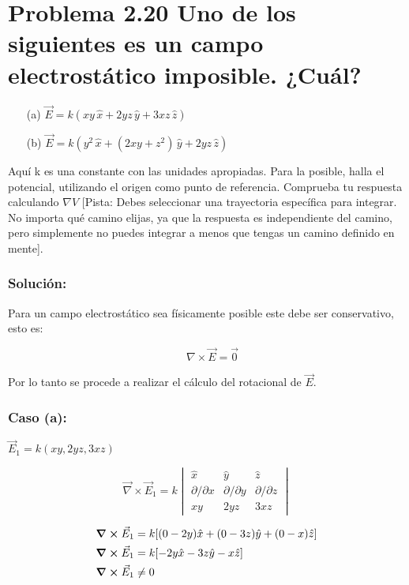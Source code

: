 \documentclass{article}
\newcommand{\problema}[2]{%
  \vspace{0.5cm}
  {\noindent\textbf{Problema #1} #2} 
  \noindent 
}
\begin{document}


\section*{\problema{2.20}{Uno de los siguientes es un campo electrostático imposible. ¿Cuál?}}

\begin{itemize}
    \item[(a)] \( \vec{E} = k(xy \, \hat{x} + 2yz \, \hat{y} + 3xz \, \hat{z}) \)
    \item[(b)] \( \vec{E} = k(y^2 \, \hat{x} + (2xy + z^2) \, \hat{y} + 2yz \, \hat{z}) \)
\end{itemize}

Aquí k es una constante con las unidades apropiadas. Para la posible, halla el potencial, utilizando el origen como punto de referencia.
Comprueba tu respuesta calculando \(\nabla V\)  [Pista: Debes seleccionar una trayectoria específica para integrar. No importa qué camino elijas, ya que la respuesta
es independiente del camino, pero simplemente no puedes integrar a menos que tengas un camino definido en mente].

\subsubsection*{Solución:}
Para un campo electrostático sea físicamente posible este debe ser conservativo, esto es: 

\[
   \quad \nabla \times \vec{E} = \vec{0}
\]

Por lo tanto se procede a realizar el cálculo del rotacional de $\vec{E}$.

\subsubsection*{Caso (a):}
$\vec{E}_{1} = k(xy, 2yz, 3xz)$

\[
\vec{\nabla} \times \vec{E}_{1} = k
\begin{vmatrix}
\hat{x} & \hat{y} & \hat{z} \\
\partial/\partial x & \partial/\partial y & \partial/\partial z \\
xy & 2yz & 3xz
\end{vmatrix}
\]

\begin{align*}
  \curl{\vec{E}_{1}} &= k [(0-2y)\hat{x} + (0-3z)\hat{y} + (0-x)\hat{z}] \\
  \curl{\vec{E}_{1}} &= k [-2y\hat{x} - 3z\hat{y} - x\hat{z} ] \\
  \curl{\vec{E}_{1}} &\neq 0
\end{align*}
\end{document}

